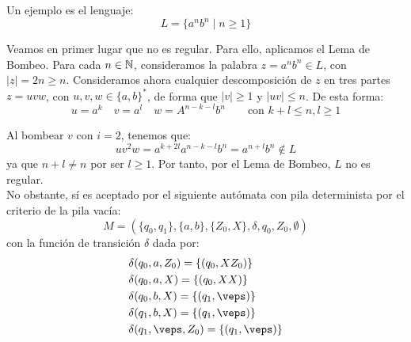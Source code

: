 \begin{ejercicio}
\begin{enumerate}
        Un ejemplo es el lenguaje:
        \begin{equation*}
            L=\{a^n b^n \mid n\geq 1\}
        \end{equation*}

        Veamos en primer lugar que no es regular. Para ello, aplicamos el Lema de Bombeo.
        Para cada $n\in \mathbb{N}$, consideramos la palabra $z=a^n b^n\in L$, con $|z|=2n\geq n$. Consideramos ahora cualquier descomposición de $z$ en tres partes $z=uvw$, con $u,v,w\in {\{a,b\}}^{\ast}$, de forma que $|v|\geq 1$ y $|uv|\leq n$. De esta forma:
        \begin{equation*}
            u=a^k \quad v=a^l \quad w=A^{n-k-l}b^n\qquad \text{con } k+l\leq n, l\geq 1
        \end{equation*}

        Al bombear $v$ con $i=2$, tenemos que:
        \begin{equation*}
            uv^2w = a^{k+2l}a^{n-k-l}b^n = a^{n+l}b^n \notin L
        \end{equation*}
        ya que $n+l\neq n$ por ser $l\geq 1$. Por tanto, por el Lema de Bombeo, $L$ no es regular.\\

        No obstante, sí es aceptado por el siguiente autómata con pila determinista por el criterio de la pila vacía:
        \begin{equation*}
            M = (\{q_0,q_1\},\{a,b\},\{Z_0,X\},\delta,q_0,Z_0,\emptyset)
        \end{equation*}
        con la función de transición $\delta$ dada por:
        \begin{align*}
            &\delta(q_0,a,Z_0) = \{(q_0,XZ_0)\} \\
            &\delta(q_0,a,X) = \{(q_0,XX)\} \\
            &\delta(q_0,b,X) = \{(q_1,\veps)\} \\
            &\delta(q_1,b,X) = \{(q_1,\veps)\} \\
            &\delta(q_1,\veps,Z_0) = \{(q_1,\veps)\}
        \end{align*}
    \end{enumerate}
\end{ejercicio}

